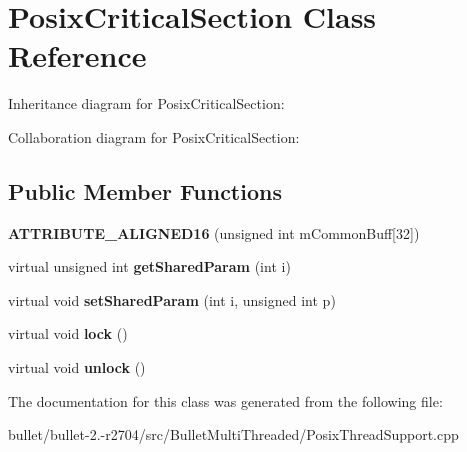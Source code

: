 \hypertarget{class_posix_critical_section}{\section{Posix\+Critical\+Section Class Reference}
\label{class_posix_critical_section}
}


Inheritance diagram for Posix\+Critical\+Section\+:


Collaboration diagram for Posix\+Critical\+Section\+:
\subsection*{Public Member Functions}
\begin{DoxyCompactItemize}
\item 
\hypertarget{class_posix_critical_section_a138ac0047f4646b7744a4291f5af62e5}{{\bfseries A\+T\+T\+R\+I\+B\+U\+T\+E\+\_\+\+A\+L\+I\+G\+N\+E\+D16} (unsigned int m\+Common\+Buff\mbox{[}32\mbox{]})}\label{class_posix_critical_section_a138ac0047f4646b7744a4291f5af62e5}

\item 
\hypertarget{class_posix_critical_section_ae27f1cc315798ca0487778b38ca5aa76}{virtual unsigned int {\bfseries get\+Shared\+Param} (int i)}\label{class_posix_critical_section_ae27f1cc315798ca0487778b38ca5aa76}

\item 
\hypertarget{class_posix_critical_section_a4c0eafb1d8cfce392f81872ee16771a4}{virtual void {\bfseries set\+Shared\+Param} (int i, unsigned int p)}\label{class_posix_critical_section_a4c0eafb1d8cfce392f81872ee16771a4}

\item 
\hypertarget{class_posix_critical_section_aea6384be1b96f4ec30c23d3c6a781d32}{virtual void {\bfseries lock} ()}\label{class_posix_critical_section_aea6384be1b96f4ec30c23d3c6a781d32}

\item 
\hypertarget{class_posix_critical_section_aa1352095de29b845c8f61392663a82e9}{virtual void {\bfseries unlock} ()}\label{class_posix_critical_section_aa1352095de29b845c8f61392663a82e9}

\end{DoxyCompactItemize}


The documentation for this class was generated from the following file\+:\begin{DoxyCompactItemize}
\item 
bullet/bullet-\/2.-\/r2704/src/\+Bullet\+Multi\+Threaded/Posix\+Thread\+Support.\+cpp\end{DoxyCompactItemize}
